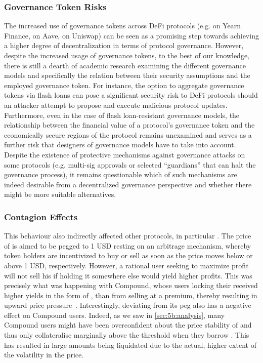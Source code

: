 \subsubsection{Governance Token Risks}
The increased use of governance tokens across DeFi protocols (e.g.  on Yearn Finance,  on Aave,  on Uniswap) can be seen as a promising step towards achieving a higher degree of decentralization in terms of protocol governance. 
However, despite the increased usage of governance tokens, to the best of our knowledge, there is still a dearth of academic research examining the different governance models and specifically the relation between their security assumptions and the employed governance token.
For instance, the option to aggregate governance tokens via flash loans \cite{wang2020} can pose a significant security risk to DeFi protocols should an attacker attempt to propose and execute malicious protocol updates.
Furthermore, even in the case of flash loan-resistant governance models, the relationship between the financial value of a protocol's governance token and the economically secure regions of the protocol remains unexamined and serves as a further risk that designers of governance models have to take into account.
Despite the existence of protective mechanisms against governance attacks on some protocols (e.g. multi-sig approvals or selected ``guardians'' that can halt the governance process), it remains questionable which of such mechanisms are indeed desirable from a decentralized governance perspective and whether there might be more suitable alternatives.

\subsubsection{Contagion Effects}
This behaviour also indirectly affected other protocols, in particular .
The price of  is aimed to be pegged to 1 USD resting on an arbitrage mechanism, whereby token holders are incentivized to buy or sell  as soon as the price moves below or above 1 USD, respectively.
However, a rational user seeking to maximize profit will not sell his  if holding it somewhere else would yield higher profits.
This was precisely what was happening with Compound, whose users locking their  received higher yields in the form of , than from selling  at a premium, thereby resulting in upward price pressure~\cite{cyrus2020upcoming}.
Interestingly,  deviating from its peg also has a negative effect on Compound users.
Indeed, as we saw in \autoref{sec:5b:analysis}, many Compound users might have been overconfident about the price stability of  and thus only collateralise marginally above the threshold when they borrow .
This has resulted in large amounts being liquidated due to the actual, higher extent of the volatility in the  price.

